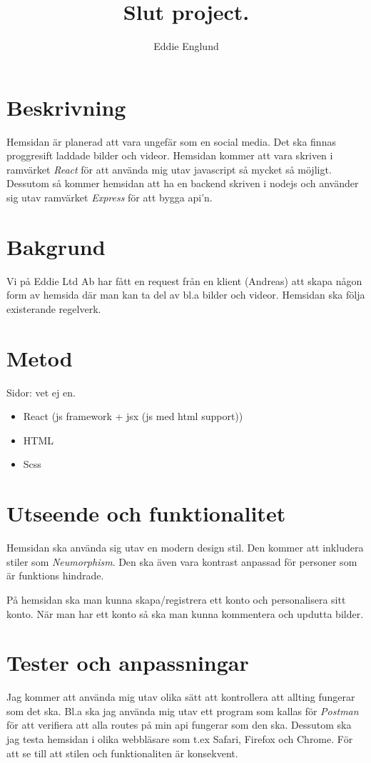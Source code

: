 \documentclass{article}
\title{Slut project.}
\author{Eddie Englund}
\begin{document}
    \maketitle


    \section{Beskrivning}

        Hemsidan är planerad att vara ungefär som en social media. Det ska finnas proggresift laddade bilder och videor. Hemsidan kommer att vara skriven i ramvärket \textit{React} för att använda mig utav javascript så mycket så möjligt. Dessutom så kommer hemsidan att ha en backend skriven i nodejs och använder sig utav ramvärket \textit{Express} för att bygga api'n. 
    \section{Bakgrund}
        Vi på Eddie Ltd Ab har fått en request från en klient (Andreas) att skapa någon form av hemsida där man kan ta del av bl.a bilder och videor. Hemsidan ska följa existerande regelverk.
    \section{Metod}
        Sidor: vet ej en.
        \begin{itemize}
            \item React (js framework + jsx (js med html support))
            \item HTML
            \item Scss
        \end{itemize}
    \section{Utseende och funktionalitet}
        Hemsidan ska använda sig utav en modern design stil. Den kommer att inkludera stiler som \textit{Neumorphism}. Den ska även vara kontrast anpassad för personer som är funktions hindrade.

        På hemsidan ska man kunna skapa/registrera ett konto och personalisera sitt konto. När man har ett konto så ska man kunna kommentera och updutta bilder.
    \section{Tester och anpassningar}
        Jag kommer att använda mig utav olika sätt att kontrollera att allting fungerar som det ska. Bl.a ska jag använda mig utav ett program som kallas för \textit{Postman} för att verifiera att alla routes på min api fungerar som den ska. Dessutom ska jag testa hemsidan i olika webbläsare som t.ex Safari, Firefox och Chrome. För att se till att stilen och funktionaliten är konsekvent.
\end{document}
